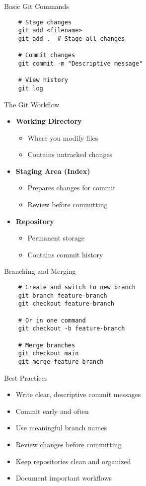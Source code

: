 \documentclass[10pt]{beamer}
\begin{document}
\begin{frame}[fragile]{Basic Git Commands}
    \begin{verbatim}
    # Stage changes
    git add <filename>
    git add .  # Stage all changes
    
    # Commit changes
    git commit -m "Descriptive message"
    
    # View history
    git log
    \end{verbatim}
\end{frame}

\begin{frame}{The Git Workflow}
    \begin{itemize}
        \item \textbf{Working Directory}
        \begin{itemize}
            \item Where you modify files
            \item Contains untracked changes
        \end{itemize}
        \item \textbf{Staging Area (Index)}
        \begin{itemize}
            \item Prepares changes for commit
            \item Review before committing
        \end{itemize}
        \item \textbf{Repository}
        \begin{itemize}
            \item Permanent storage
            \item Contains commit history
        \end{itemize}
    \end{itemize}
\end{frame}

\begin{frame}[fragile]{Branching and Merging}
    \begin{verbatim}
    # Create and switch to new branch
    git branch feature-branch
    git checkout feature-branch
    
    # Or in one command
    git checkout -b feature-branch
    
    # Merge branches
    git checkout main
    git merge feature-branch
    \end{verbatim}
\end{frame}

\begin{frame}{Best Practices}
    \begin{itemize}
        \item Write clear, descriptive commit messages
        \item Commit early and often
        \item Use meaningful branch names
        \item Review changes before committing
        \item Keep repositories clean and organized
        \item Document important workflows
    \end{itemize}
\end{frame}
\end{document}
